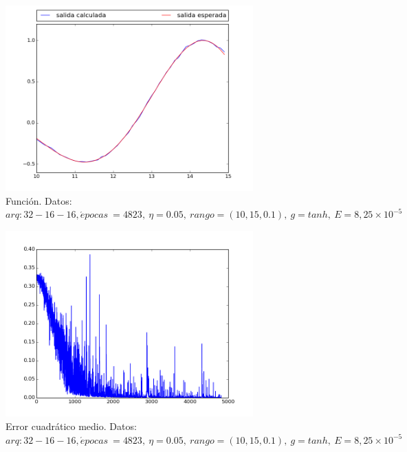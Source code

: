 \documentclass[12pt,a4paper]{article}
\begin{document}
\begin{figure}[H]
\centering
\includegraphics[width=0.85\textwidth]{img/_32__16__16_-eta_0_05-1430817237_7846918-FUNCTION.png}
\caption{\label{fig:test10-15-tanh-fn-32} Función. Datos:  $arq: 32-16-16, \acute{e} pocas \ = 4823, \ \eta = 0.05,\ rango=(10, 15, 0.1),\ g=tanh, \ E = 8,25 \times 10^{-5}$}
\end{figure}

\begin{figure}[H]
\centering
\includegraphics[width=0.85\textwidth]{img/_32__16__16_-eta_0_05-1430817237_7846918-ERROR.png}
\caption{\label{fig:test10-15-tanh-error-32} Error cuadrático medio. Datos:  $arq: 32-16-16, \acute{e} pocas \ = 4823, \ \eta = 0.05,\ rango=(10, 15, 0.1),\ g=tanh, \ E = 8,25 \times 10^{-5}$}
\end{figure}
\end{document}
